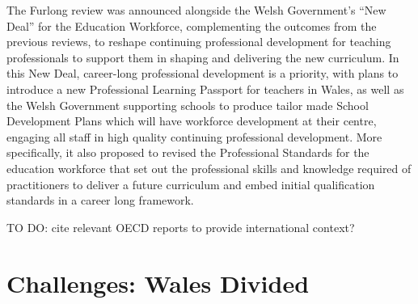 \documentclass{sig-alternate}
\begin{document}

The Furlong review was announced alongside the Welsh Government's ``New
Deal'' for the Education Workforce, complementing the outcomes from the
previous reviews, to reshape continuing professional development for
teaching professionals to support them in shaping and delivering the
new curriculum. In this New Deal, career-long professional development
is a priority, with plans to introduce a new Professional Learning
Passport for teachers in Wales, as well as the Welsh Government
supporting schools to produce tailor made School Development Plans
which will have workforce development at their centre, engaging all
staff in high quality continuing professional development. More
specifically, it also proposed to revised the Professional Standards
for the education workforce that set out the professional skills and
knowledge required of practitioners to deliver a future curriculum and
embed initial qualification standards in a career long framework.


TO DO: cite relevant OECD reports to provide international context?



\section{Challenges: Wales Divided}
\end{document}
